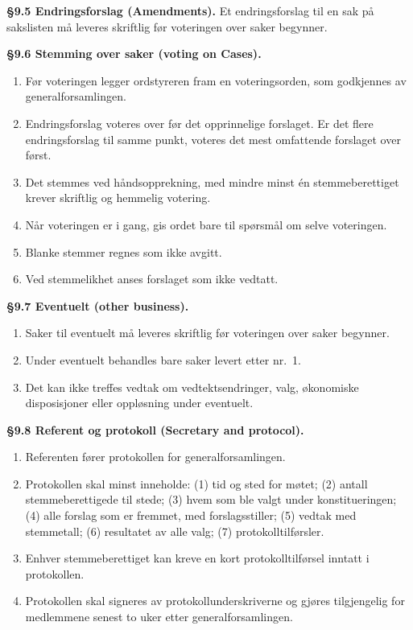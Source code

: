 \documentclass{../../../Common/Latex/Templates/rapport}
\begin{document}
\textbf{\S 9.5 Endringsforslag (Amendments).}\label{nbylaw:9.5} Et endringsforslag til en sak p\r{a} sakslisten m\r{a} leveres skriftlig før voteringen over saker begynner.

\textbf{\S 9.6 Stemming over saker (voting on Cases).}\label{nbylaw:9.6}
\begin{enumerate}
  \item Før voteringen legger ordstyreren fram en voteringsorden, som godkjennes av generalforsamlingen.
  \item Endringsforslag voteres over før det opprinnelige forslaget. Er det flere endringsforslag til samme punkt, voteres det mest omfattende forslaget over først.
  \item Det stemmes ved h\r{a}ndsopprekning, med mindre minst \'en stemmeberettiget krever skriftlig og hemmelig votering.
  \item N\r{a}r voteringen er i gang, gis ordet bare til spørsm\r{a}l om selve voteringen.
  \item Blanke stemmer regnes som ikke avgitt.
  \item Ved stemmelikhet anses forslaget som ikke vedtatt.
\end{enumerate}

\textbf{\S 9.7 Eventuelt (other business).}\label{nbylaw:9.7}
\begin{enumerate}
  \item Saker til eventuelt m\r{a} leveres skriftlig før voteringen over saker begynner.
  \item Under eventuelt behandles bare saker levert etter nr.\ 1.
  \item Det kan ikke treffes vedtak om vedtektsendringer, valg, økonomiske disposisjoner eller oppløsning under eventuelt.
\end{enumerate}

\textbf{\S 9.8 Referent og protokoll (Secretary and protocol).}\label{nbylaw:9.8}
\begin{enumerate}
  \item Referenten fører protokollen for generalforsamlingen.
  \item Protokollen skal minst inneholde: (1) tid og sted for møtet; (2) antall stemmeberettigede til stede; (3) hvem som ble valgt under konstitueringen; (4) alle forslag som er fremmet, med forslagsstiller; (5) vedtak med stemmetall; (6) resultatet av alle valg; (7) protokolltilførsler.
  \item Enhver stemmeberettiget kan kreve en kort protokolltilførsel inntatt i protokollen.
  \item Protokollen skal signeres av protokollunderskriverne og gjøres tilgjengelig for medlemmene senest to uker etter generalforsamlingen.
\end{enumerate}
\end{document}
